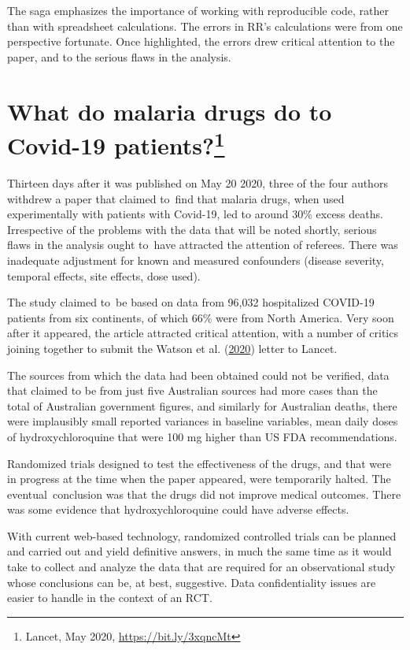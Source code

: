 \documentclass[
  10pt,
  b5paper]{book}
\begin{document}
The saga emphasizes the importance of working with reproducible code,
rather than with spreadsheet calculations.
The errors in RR's calculations were from one perspective fortunate.
Once highlighted, the errors drew critical attention to the paper,
and to the serious flaws in the analysis.

\hypertarget{sec:lancet}{%
\section[What do malaria drugs do to Covid-19 patients?]{\texorpdfstring{What do malaria drugs do to Covid-19 patients?\footnote{Lancet, May 2020, \url{https://bit.ly/3xqncMt}}}{What do malaria drugs do to Covid-19 patients?}}\label{sec:lancet}}

Thirteen days after it was published on May 20 2020, three of the
four authors withdrew a paper that claimed to~find that malaria drugs,
when used experimentally with patients with Covid-19, led to around
30\% excess deaths. Irrespective of the problems with the data that
will be noted shortly, serious flaws in the analysis ought to~have
attracted the attention of referees. There was inadequate
adjustment for known and measured confounders (disease severity,
temporal effects, site effects, dose used).

The study claimed to~be based on data from 96,032
hospitalized COVID-19 patients from six continents, of which 66\%
were from North America. Very soon after it appeared, the article
attracted critical attention, with a number of critics joining
together to submit the Watson et al. (\protect\hyperlink{ref-watson2020open}{2020}) letter to Lancet.

The sources from which the data had been obtained could not be verified,
data that claimed to be from just five Australian sources had more
cases than the total of Australian government figures, and similarly
for Australian deaths, there were implausibly small reported variances
in baseline variables, mean daily doses of hydroxychloroquine that were
100 mg higher than US FDA recommendations.

Randomized trials designed to test the effectiveness of the drugs,
and that were in progress at the time when the paper appeared,
were temporarily halted. The eventual~conclusion was that the
drugs did not improve medical outcomes. There was some evidence
that hydroxychloroquine could have adverse effects.

With current web-based technology, randomized controlled trials
can be planned and carried out and yield definitive answers, in
much the same time as it would take to collect and analyze the
data that are required for an observational study whose
conclusions can be, at best, suggestive. Data confidentiality
issues are easier to handle in the context of an RCT.
\end{document}
